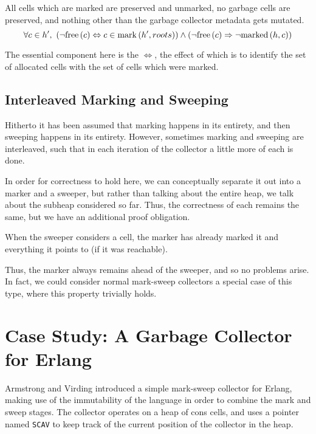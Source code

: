 \begin{definition}
  \label{def:ms-correct-sweeping}
  All cells which are marked are preserved and unmarked, no garbage
  cells are preserved, and nothing other than the garbage collector
  metadata gets mutated.
  \[\forall c \in h',\ \left(\lnot\mathrm{free}\left(c\right) \Leftrightarrow c \in
    \mathrm{mark}\left(h', roots\right)\right) \land \left(\lnot\mathrm{free}\left(c\right) \Rightarrow
    \lnot\mathrm{marked}\left(h, c\right)\right)\]
\end{definition}

The essential component here is the $\iff$, the effect of which is to
identify the set of allocated cells with the set of cells which were
marked.

\subsection{Interleaved Marking and Sweeping}
\label{sec:marksweep-sweeping-interleaved}

Hitherto it has been assumed that marking happens in its entirety, and
then sweeping happens in its entirety. However, sometimes marking and
sweeping are interleaved, such that in each iteration of the collector
a little more of each is done.

In order for correctness to hold here, we can conceptually separate it
out into a marker and a sweeper, but rather than talking about the
entire heap, we talk about the subheap considered so far. Thus, the
correctness of each remains the same, but we have an additional proof
obligation.

\begin{definition}
  \label{def:ms-interleaved}
  When the sweeper considers a cell, the marker has already marked it
  and everything it points to (if it was reachable).
\end{definition}

Thus, the marker always remains ahead of the sweeper, and so no
problems arise. In fact, we could consider normal mark-sweep
collectors a special case of this type, where this property trivially
holds.

\section{Case Study: A Garbage Collector for Erlang}
\label{sec:marksweep-example}

Armstrong and Virding\cite{Armstrong95} introduced a simple mark-sweep
collector for Erlang, making use of the immutability of the language
in order to combine the mark and sweep stages. The collector operates
on a heap of cons cells, and uses a pointer named \texttt{SCAV} to
keep track of the current position of the collector in the heap.

